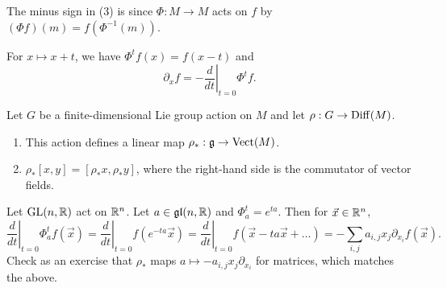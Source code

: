 \begin{remark}
  The minus sign in (3)
  is since $\Phi : M \to M$ acts on $f$
  by $(\Phi f)(m) = f(\Phi^{-1}(m))$.
\end{remark}

\begin{example}
  For $x \mapsto x + t$, we have
  $\Phi^t f(x) = f(x - t)$ and
  \[
    \partial_x f
    = -\left.\frac{d}{dt}\right|_{t = 0} \Phi^t f.
  \]
\end{example}

\begin{theorem}
  Let $G$ be a finite-dimensional
  Lie group action on $M$ and let
  $\rho : G \to \operatorname{Diff}(M)$.
  \begin{enumerate}
    \item This action defines a
      linear map $\rho_* : \mathfrak{g} \to \operatorname{Vect}(M)$.
    \item $\rho_*[x, y] = [\rho_* x, \rho_* y]$, where
      the right-hand side is the commutator
      of vector fields.
  \end{enumerate}
\end{theorem}

\begin{example}
  Let $\operatorname{GL}(n, \mathbb{R})$ act on $\mathbb{R}^n$.
  Let $a \in \mathfrak{gl}(n, \mathbb{R})$ and
  $\Phi^t_a = e^{ta}$. Then for
  $\vec{x} \in \mathbb{R}^n$,
  \[
    \left. \frac{d}{dt}\right|_{t = 0}
      \Phi^t_a f(\vec{x})
      = \left. \frac{d}{dt}\right|_{t = 0}
        f(e^{-ta} \vec{x})
      = \left. \frac{d}{dt}\right|_{t = 0}
        f(\vec{x} - t a \vec{x} + \dots)
        = - \sum_{i, j} a_{i, j} x_j \partial_{x_i} f(\vec{x}).
  \]
  Check as an exercise that
  $\rho_*$ maps
  $a \mapsto - a_{i, j} x_j \partial_{x_i}$
  for matrices, which matches
  the above.
\end{example}
